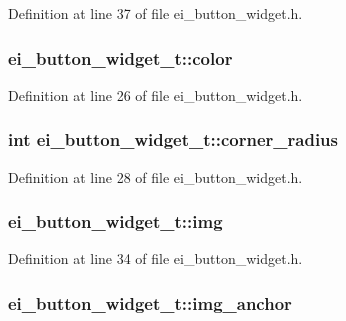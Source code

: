 Definition at line 37 of file ei\-\_\-button\-\_\-widget.\-h.

\hypertarget{structei__button__widget__t_a4fda3db8c1feae5c9af783ccda98bdaf}{
\subsubsection[{color}]{ ei\-\_\-button\-\_\-widget\-\_\-t\-::color}}\label{structei__button__widget__t_a4fda3db8c1feae5c9af783ccda98bdaf}


Definition at line 26 of file ei\-\_\-button\-\_\-widget.\-h.

\hypertarget{structei__button__widget__t_a39201d2e78e7d968ba66ceaa34d40f87}{
\subsubsection[{corner\-\_\-radius}]{\setlength{\rightskip}{0pt plus 5cm}int ei\-\_\-button\-\_\-widget\-\_\-t\-::corner\-\_\-radius}}\label{structei__button__widget__t_a39201d2e78e7d968ba66ceaa34d40f87}


Definition at line 28 of file ei\-\_\-button\-\_\-widget.\-h.

\hypertarget{structei__button__widget__t_af4b80571568794c12bd89b0c241b6f59}{
\subsubsection[{img}]{ ei\-\_\-button\-\_\-widget\-\_\-t\-::img}}\label{structei__button__widget__t_af4b80571568794c12bd89b0c241b6f59}


Definition at line 34 of file ei\-\_\-button\-\_\-widget.\-h.

\hypertarget{structei__button__widget__t_ad0d7ec24f441b9bec4956f68bd9e2cfe}{
\subsubsection[{img\-\_\-anchor}]{ ei\-\_\-button\-\_\-widget\-\_\-t\-::img\-\_\-anchor}}\label{structei__button__widget__t_ad0d7ec24f441b9bec4956f68bd9e2cfe}


